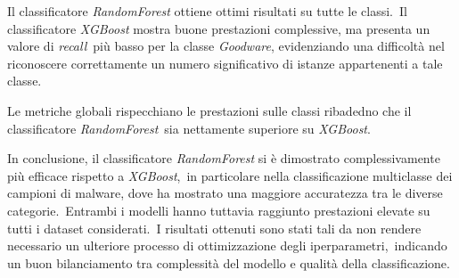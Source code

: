 \FloatBarrier


Il classificatore \textit{RandomForest} ottiene ottimi risultati su tutte le classi.\
Il classificatore \textit{XGBoost} mostra buone prestazioni complessive, ma presenta un valore di \textit{recall}\
più basso per la classe \textit{Goodware}, evidenziando una difficoltà nel riconoscere correttamente un numero significativo di istanze appartenenti a tale classe.

\begin{figure}[t]
    \centering
    \adjustbox{max width=1.4\linewidth, max height=1.2\textheight}{%
        
    }
    \caption{}
    \label{fig:octack-mtrx-rf}
\end{figure}

\FloatBarrier

Le metriche globali rispecchiano le prestazioni sulle classi ribadedno che il classificatore \textit{RandomForest}\
sia nettamente superiore su \textit{XGBoost}.


In conclusione, il classificatore \textit{RandomForest} si è dimostrato complessivamente più efficace rispetto a \textit{XGBoost},\
in particolare nella classificazione multiclasse dei campioni di malware, dove ha mostrato una maggiore accuratezza tra le diverse categorie.\
Entrambi i modelli hanno tuttavia raggiunto prestazioni elevate su tutti i dataset considerati.\
I risultati ottenuti sono stati tali da non rendere necessario un ulteriore processo di ottimizzazione degli iperparametri,\
indicando un buon bilanciamento tra complessità del modello e qualità della classificazione.
